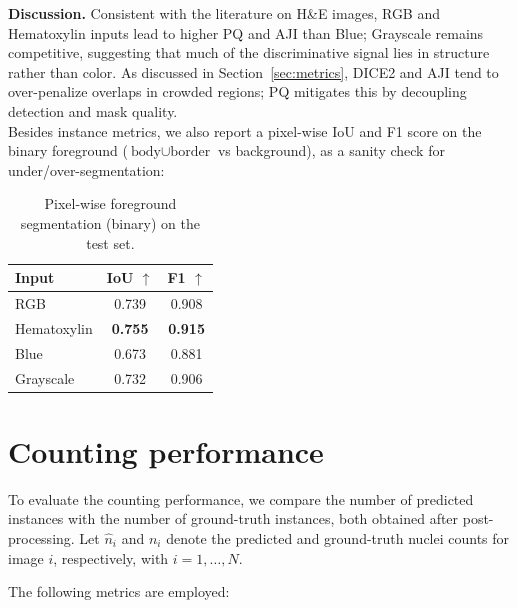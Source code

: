 \documentclass[target=bach,aauheader=,style=]{thud}
\begin{document}
\noindent\textbf{Discussion.} 
Consistent with the literature on H\&E images, RGB and Hematoxylin inputs lead to higher PQ and AJI than Blue; Grayscale remains competitive, suggesting that much of the discriminative signal lies in structure rather than color. 
As discussed in Section~\ref{sec:metrics}, DICE2 and AJI tend to over-penalize overlaps in crowded regions; PQ mitigates this by decoupling detection and mask quality.\\

Besides instance metrics, we also report a pixel-wise IoU and F1 score on the binary foreground ($\text{body}\cup\text{border}$ vs background), as a sanity check for under/over-segmentation:

\begin{table}[ht]
\centering
\caption{Pixel-wise foreground segmentation (binary) on the test set.}
\label{tab:pix-binary}
\small
\begin{tabular}{lcc}
\toprule
\textbf{Input} & \textbf{IoU} $\uparrow$ & \textbf{F1} $\uparrow$ \\
\midrule
RGB         & 0.739 & 0.908 \\
Hematoxylin & \textbf{0.755} & \textbf{0.915}\\
Blue        & 0.673 & 0.881 \\
Grayscale   & 0.732 & 0.906 \\
\bottomrule
\end{tabular}
\end{table}

\section{Counting performance}
To evaluate the counting performance, we compare the number of predicted instances with the number of ground-truth instances, both obtained after post-processing. 
Let $\hat{n}_i$ and $n_i$ denote the predicted and ground-truth nuclei counts for image $i$, respectively, with $i=1,\dots,N$.

The following metrics are employed:
\end{document}
